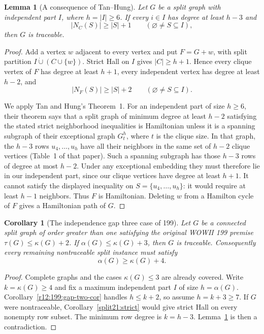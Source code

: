 \documentclass[11pt,a4paper]{article}
\newtheorem{lemma}[theorem]{Lemma}
\newtheorem{corollary}[theorem]{Corollary}
\theoremstyle{definition}\newtheorem{definition}[theorem]{Definition}
\theoremstyle{remark}\newtheorem{remark}[theorem]{Remark}
\begin{document}
\begin{lemma}[A consequence of Tan--Hung]
\label{r12:199:strict-degree}
Let $G$ be a split graph with independent part $I$, where $h=|I|\ge6$.
If every $i\in I$ has degree at least $h-3$ and
\[
 |N_C(S)|\ge |S|+1\qquad(\varnothing\ne S\subseteq I),
\]
then $G$ is traceable.
\end{lemma}
\begin{proof}
Add a vertex $w$ adjacent to every vertex and put $F=G+w$, with split
partition $I\mathbin{\dot\cup}(C\cup\{w\})$. Strict Hall on $I$ gives
$|C|\ge h+1$. Hence every clique vertex of $F$ has degree at least
$h+1$, every independent vertex has degree at least $h-2$, and
\[
 |N_F(S)|\ge |S|+2\qquad(\varnothing\ne S\subseteq I).
\]

We apply Tan and Hung's Theorem~1\cite{TanHung2004}. For an independent
part of size $h\ge6$, their theorem says that a split graph of minimum
degree at least $h-2$ satisfying the stated strict neighborhood
inequalities is Hamiltonian unless it is a spanning subgraph of their
exceptional graph $G^h_t$, where $t$ is the clique size. In that graph,
the $h-3$ rows $u_4,\ldots,u_h$ have all their neighbors in the same
set of $h-2$ clique vertices (Table~1 of that paper). Such a spanning
subgraph has those $h-3$ rows of degree at most $h-2$. Under any
exceptional embedding they must therefore lie in our independent part,
since our clique vertices have degree at least $h+1$. It cannot satisfy
the displayed inequality on
$S=\{u_4,\ldots,u_h\}$: it would require at least $h-1$ neighbors.
Thus $F$ is Hamiltonian. Deleting $w$ from a Hamilton cycle of $F$
gives a Hamiltonian path of $G$.
\end{proof}

\begin{corollary}[The independence gap three case of 199]
\label{r12:199:gap-three-cor}
Let $G$ be a connected split graph of order greater than one satisfying
the original WOWII 199 premise $\tau(G)\le\kappa(G)+2$.
If $\alpha(G)\le\kappa(G)+3$, then $G$ is traceable.
Consequently every remaining nontraceable split instance must satisfy
\[
 \alpha(G)\ge\kappa(G)+4.
\]
\end{corollary}
\begin{proof}
Complete graphs and the cases $\kappa(G)\le3$ are already covered.
Write $k=\kappa(G)\ge4$ and fix a maximum independent part
$I$ of size $h=\alpha(G)$. Corollary~\ref{r12:199:gap-two-cor}
handles $h\le k+2$, so assume $h=k+3\ge7$.
If $G$ were nontraceable, Corollary~\ref{split21:strict} would give
strict Hall on every nonempty row subset. The minimum row degree is
$k=h-3$. Lemma~\ref{r12:199:strict-degree} is then a contradiction.
\end{proof}
\end{document}
